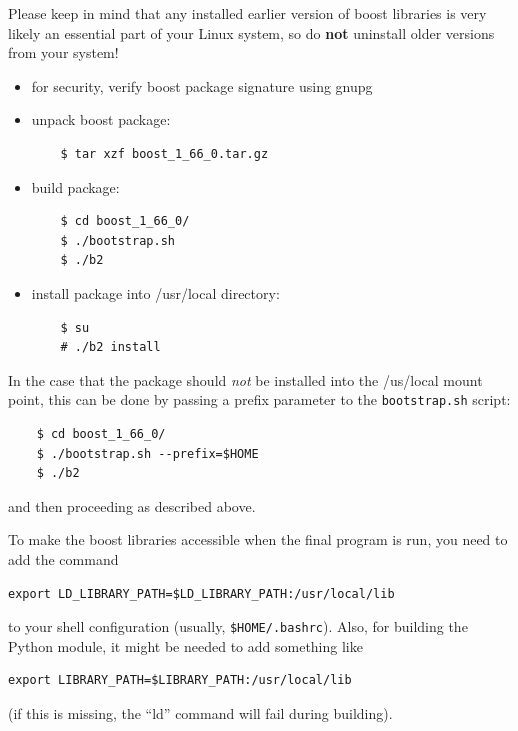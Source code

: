 \documentclass[11pt,a4paper]{scrartcl}
\begin{document}
Please keep in mind that any installed earlier version of boost
libraries is very likely an essential part of your Linux system, so do
\textbf{not} uninstall older versions from your system!

\begin{itemize}
\item for security, verify boost package signature using gnupg

\item unpack boost package:
  
  \begin{verbatim}
    $ tar xzf boost_1_66_0.tar.gz
  \end{verbatim}    

\item build package:

  \begin{verbatim}
    $ cd boost_1_66_0/
    $ ./bootstrap.sh
    $ ./b2
  \end{verbatim}


\item install package into /usr/local directory:

  \begin{verbatim}
    $ su
    # ./b2 install
  \end{verbatim}    
\end{itemize}

In the case that the package  should \emph{not} be installed
into the /us/local mount point, this can be done by passing
a prefix parameter to the \texttt{bootstrap.sh} script:

  \begin{verbatim}
    $ cd boost_1_66_0/
    $ ./bootstrap.sh --prefix=$HOME
    $ ./b2
  \end{verbatim}

  and then proceeding as described above.


To make the boost libraries accessible when the
final program is run, you need to add the
command

\begin{verbatim}
export LD_LIBRARY_PATH=$LD_LIBRARY_PATH:/usr/local/lib
\end{verbatim}

to your shell configuration (usually, \verb+$HOME/.bashrc+).
Also, for building the Python module, it might be needed
to add something like

\begin{verbatim}
export LIBRARY_PATH=$LIBRARY_PATH:/usr/local/lib
\end{verbatim}
(if this is missing, the ``ld'' command will fail during building).
\end{document}
